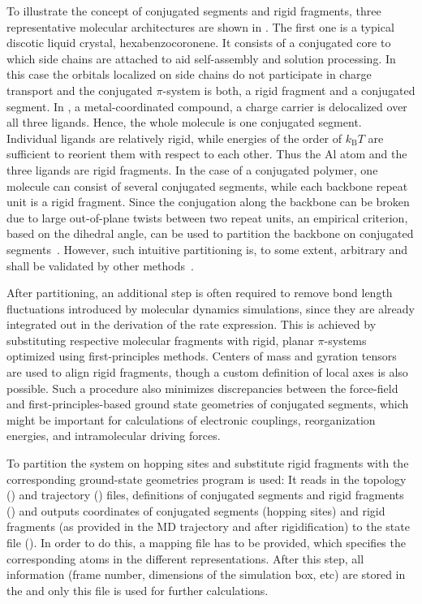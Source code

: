 To illustrate the concept of conjugated segments and rigid fragments, three representative molecular architectures are shown in . The first one is a typical discotic liquid crystal, hexabenzocoronene. It consists of a conjugated core to which side chains are attached to aid self-assembly and solution processing. In this case the orbitals localized on side chains do not participate in charge transport and the conjugated $\pi$-system is both, a rigid fragment and a conjugated segment. 
%
In \Alq, a metal-coordinated compound, a charge carrier is delocalized over all three ligands. Hence, the whole molecule is one conjugated segment. Individual ligands are relatively rigid, while energies of the order of $k_\text{B}T$ are sufficient to reorient them with respect to each other. Thus the Al atom and the three ligands are rigid fragments.
%
In the case of a conjugated polymer, one molecule can consist of several conjugated segments, while each backbone repeat unit is a rigid fragment. Since the conjugation along the backbone can be broken due to large out-of-plane twists between two repeat units, an empirical criterion, based on the dihedral angle, can be used to partition the backbone on conjugated segments~\cite{ruhle_multiscale_2010}. However, such intuitive partitioning is, to some extent, arbitrary and shall be validated by other methods~\cite{vukmirovic_charge_2008,vukmirovic_charge_2009,mcmahon_ad_2009}. 

After partitioning, an additional step is often required to remove bond length fluctuations introduced by molecular dynamics simulations, since they are already integrated out in the derivation of the rate expression. This is achieved by substituting respective molecular fragments with  rigid, planar $\pi$-systems optimized using first-principles methods. Centers of mass and gyration tensors are used to align rigid fragments, though a custom definition of local axes is also possible. Such a procedure also minimizes discrepancies between the force-field and first-principles-based ground state geometries of conjugated segments, which might be important for calculations of electronic couplings, reorganization energies, and intramolecular driving forces. 

To partition the system on hopping sites and substitute rigid fragments with the corresponding ground-state geometries \xtpmap program is used:
It reads in the \gromacs topology (\topology) and trajectory (\trajectory) files, definitions of conjugated segments and rigid fragments (\xmlcsg) and outputs coordinates of conjugated segments (hopping sites) and rigid fragments (as provided in the MD trajectory and after rigidification) to the  state file (\sqlstate). In order to do this, a mapping file \xmlcsg has to be provided, which specifies the corresponding atoms in the different representations. After this step, all information (frame number, dimensions of the simulation box, etc) are stored in the  and only this file is used for further calculations.

